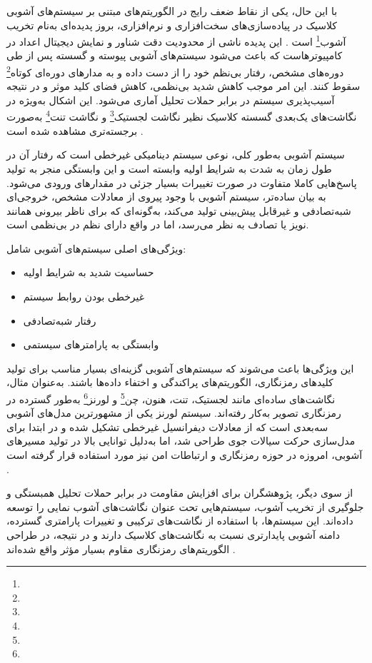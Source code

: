 با این حال، یکی از نقاط ضعف رایج در الگوریتم‌های مبتنی بر سیستم‌های آشوبی کلاسیک در پیاده‌سازی‌های سخت‌افزاری و نرم‌افزاری، بروز پدیده‌ای به‌نام تخریب آشوب\footnote{} است \cite{ref5, ref19}. این پدیده ناشی از محدودیت دقت شناور و نمایش دیجیتال اعداد در کامپیوترهاست که باعث می‌شود سیستم‌های آشوبی پیوسته و گسسته پس از طی دوره‌های مشخص، رفتار بی‌نظم خود را از دست داده و به مدارهای دوره‌ای کوتاه\footnote{} سقوط کنند. این امر موجب کاهش شدید بی‌نظمی، کاهش فضای کلید موثر و در نتیجه آسیب‌پذیری سیستم در برابر حملات تحلیل آماری می‌شود. این اشکال به‌ویژه در نگاشت‌های یک‌بعدی گسسته کلاسیک نظیر نگاشت لجستیک\footnote{} و نگاشت تنت\footnote{} به‌صورت برجسته‌تری مشاهده شده است \cite{ref5}.

سیستم آشوبی به‌طور کلی، نوعی سیستم دینامیکی غیرخطی است که رفتار آن در طول زمان به شدت به شرایط اولیه وابسته است و این وابستگی منجر به تولید پاسخ‌هایی کاملا متفاوت در صورت تغییرات بسیار جزئی در مقدارهای ورودی می‌شود. به بیان ساده‌تر، سیستم آشوبی با وجود پیروی از معادلات مشخص، خروجی‌ای شبه‌تصادفی و غیرقابل پیش‌بینی تولید می‌کند، به‌گونه‌ای که برای ناظر بیرونی همانند نویز یا تصادف به نظر می‌رسد، اما در واقع دارای نظم در بی‌نظمی است.

ویژگی‌های اصلی سیستم‌های آشوبی شامل:

\begin{itemize}
    \item حساسیت شدید به شرایط اولیه
    \item غیرخطی بودن روابط سیستم
    \item رفتار شبه‌تصادفی
    \item وابستگی به پارامترهای سیستمی
\end{itemize}

این ویژگی‌ها باعث می‌شوند که سیستم‌های آشوبی گزینه‌ای بسیار مناسب برای تولید کلیدهای رمزنگاری، الگوریتم‌های پراکندگی و اختفاء داده‌ها باشند. به‌عنوان مثال، نگاشت‌های ساده‌ای مانند لجستیک، تنت، هنون، چن\footnote{} و لورنز\footnote{} به‌طور گسترده در رمزنگاری تصویر به‌کار رفته‌اند. سیستم لورنز یکی از مشهورترین مدل‌های آشوبی سه‌بعدی است که از معادلات دیفرانسیل غیرخطی تشکیل شده و در ابتدا برای مدل‌سازی حرکت سیالات جوی طراحی شد، اما به‌دلیل توانایی بالا در تولید مسیرهای آشوبی، امروزه در حوزه رمزنگاری و ارتباطات امن نیز مورد استفاده قرار گرفته است \cite{ref6}.

از سوی دیگر، پژوهشگران برای افزایش مقاومت در برابر حملات تحلیل همبستگی و جلوگیری از تخریب آشوب، سیستم‌هایی تحت عنوان نگاشت‌های آشوب نمایی را توسعه داده‌اند. این سیستم‌ها، با استفاده از نگاشت‌های ترکیبی و تغییرات پارامتری گسترده، دامنه آشوبی پایدارتری نسبت به نگاشت‌های کلاسیک دارند و در نتیجه، در طراحی الگوریتم‌های رمزنگاری مقاوم بسیار مؤثر واقع شده‌اند \cite{ref4}.

